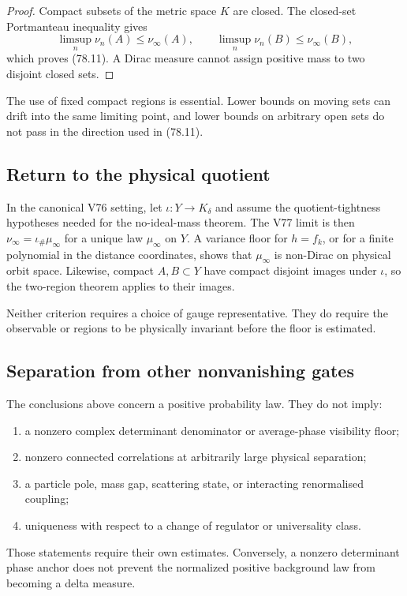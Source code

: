 \documentclass[11pt]{article}
\theoremstyle{remark}
\begin{document}
\begin{proof}
Compact subsets of the metric space \(K\) are closed.  The
closed-set Portmanteau inequality gives
\[
 \limsup_n\nu_n(A)\leq\nu_\infty(A),\qquad
 \limsup_n\nu_n(B)\leq\nu_\infty(B),
\]
which proves (78.11).  A Dirac measure cannot assign positive mass
to two disjoint closed sets.
\end{proof}

The use of fixed compact regions is essential.  Lower bounds on
moving sets can drift into the same limiting point, and lower bounds
on arbitrary open sets do not pass in the direction used in
(78.11).

\subsection{Return to the physical quotient}

In the canonical V76 setting, let
\(\iota:Y\to K_\delta\) and assume the quotient-tightness hypotheses
needed for the no-ideal-mass theorem.  The V77 limit is then
\(\nu_\infty=\iota_\#\mu_\infty\) for a unique law
\(\mu_\infty\) on \(Y\).  A variance floor for
\(h=f_k\), or for a finite polynomial in the distance coordinates,
shows that \(\mu_\infty\) is non-Dirac on physical orbit space.
Likewise, compact \(A,B\subset Y\) have compact disjoint images under
\(\iota\), so the two-region theorem applies to their images.

Neither criterion requires a choice of gauge representative.
They do require the observable or regions to be physically
invariant before the floor is estimated.

\subsection{Separation from other nonvanishing gates}

The conclusions above concern a positive probability law.  They do
not imply:
\begin{enumerate}
\item a nonzero complex determinant denominator or average-phase
      visibility floor;
\item nonzero connected correlations at arbitrarily large physical
      separation;
\item a particle pole, mass gap, scattering state, or interacting
      renormalised coupling;
\item uniqueness with respect to a change of regulator or
      universality class.
\end{enumerate}
Those statements require their own estimates.  Conversely, a
nonzero determinant phase anchor does not prevent the normalized
positive background law from becoming a delta measure.
\end{document}
